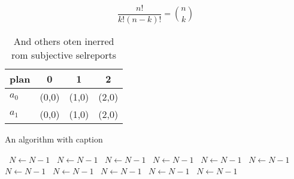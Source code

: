 \documentclass[a4paper]{article}
\begin{document}
\[ \frac{n!}{k!(n-k)!} = \binom{n}{k} \]

\begin{table}
\begin{adjustbox}{width=0.6\columnwidth}
\begin{tabular}{|l|l|l|l|}
\hline
\textbf{plan} & \multicolumn{1}{c|}{\textbf{0}} & \multicolumn{1}{c|}{\textbf{1}} & \multicolumn{1}{c|}{\textbf{2}} \\ \hline
\textbf{$a_0$}  & (0,0) & (1,0) & (2,0) \\ \hline
\textbf{$a_1$}  & (0,0) & (1,0) & (2,0) \\ \hline
\end{tabular}
\end{adjustbox}
\caption{And others oten inerred rom subjective selreports
}
\end{table}

\begin{algorithm}
\caption{An algorithm with caption}
\begin{algorithmic}
\    \State $N \gets N - 1$
\    \State $N \gets N - 1$
\    \State $N \gets N - 1$
\    \State $N \gets N - 1$
\    \State $N \gets N - 1$
\    \State $N \gets N - 1$
\    \State $N \gets N - 1$
\    \State $N \gets N - 1$
\    \State $N \gets N - 1$
\    \State $N \gets N - 1$
\    \State $N \gets N - 1$
\EndWhile
\end{algorithmic}
\end{algorithm}
\end{document}
